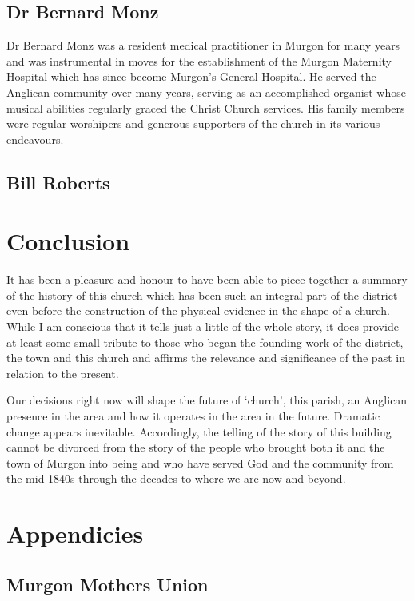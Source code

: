 \section{Dr Bernard Monz}

Dr Bernard Monz was a resident medical practitioner in Murgon for many
years and was instrumental in moves for the establishment of the Murgon
Maternity Hospital which has since become Murgon's General Hospital. He
served the Anglican community over many years, serving as an
accomplished organist whose musical abilities regularly graced the
Christ Church services. His family members were regular worshipers and
generous supporters of the church in its various endeavours.

\section{Bill Roberts}

\chapter{Conclusion}

It has been a pleasure and honour to have been able to piece together a
summary of the history of this church which has been such an integral
part of the district even before the construction of the physical
evidence in the shape of a church. While I am conscious that it tells
just a little of the whole story, it does provide at least some small
tribute to those who began the founding work of the district, the town
and this church and affirms the relevance and significance of the past
in relation to the present.

Our decisions right now will shape the future of `church', this parish,
an Anglican presence in the area and how it operates in the area in the
future. Dramatic change appears inevitable. Accordingly, the telling of
the story of this building cannot be divorced from the story of the
people who brought both it and the town of Murgon into being and who
have served God and the community from the mid-1840s through the decades
to where we are now and beyond.

\chapter{Appendicies}

\section{Murgon Mothers Union}

